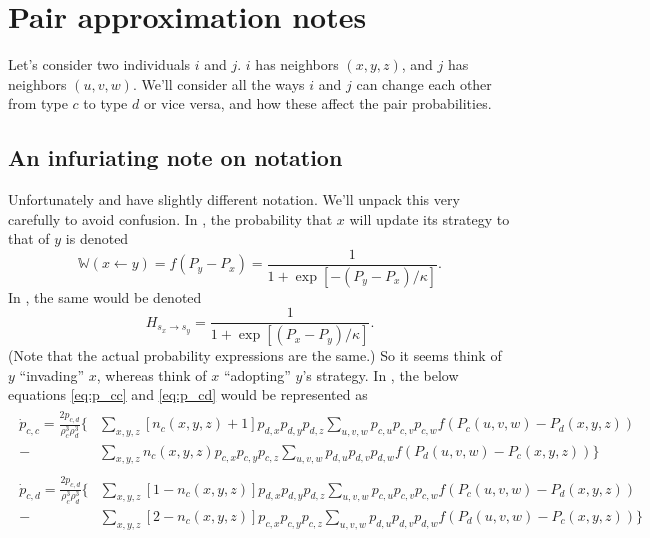 \documentclass[13pt]{amsart}
\begin{document}
\section*{Pair approximation notes}

Let's consider two individuals $i$ and $j$.
$i$ has neighbors $(x, y, z)$, and $j$ has neighbors $(u, v, w)$.
We'll consider all the ways $i$ and $j$ can change each other from type $c$ to type $d$ or vice versa, and how these affect the pair probabilities.

\subsection*{An infuriating note on notation}

Unfortunately \citet{hauert.szabo_2005} and \citet{li.etal_2019} have slightly different notation.
We'll unpack this very carefully to avoid confusion.
In \citet{hauert.szabo_2005}, the probability that $x$ will update its strategy to that of $y$ is denoted
\begin{equation}
  \mathbb{W}(x \leftarrow y) = f(P_y - P_x) = \frac{1}{1+\exp\left[ -(P_y - P_x)/\kappa \right] }.
\end{equation}
In \citet{li.etal_2019}, the same would be denoted
\begin{equation}
  H_{s_x \rightarrow s_y} = \frac{1}{1+\exp\left[ (P_x - P_y)/\kappa \right] }.
\end{equation}
(Note that the actual probability expressions are the same.)
So it seems \citet{hauert.szabo_2005} think of $y$ ``invading'' $x$, whereas \citet{li.etal_2019} think of $x$ ``adopting'' $y$'s strategy.
In \citet{hauert.szabo_2005}, the below equations \ref{eq:p_cc} and \ref{eq:p_cd} would be represented as
\begin{align}
    \begin{split}
        \label{eq:p_cc_hauert}
        \dot{p}_{c,c} =
        \frac{2p_{c,d}}{\rho_c^3 \rho_d^3} \bigg\{ & \sum_{x,y,z} \left[n_c (x,y,z) + 1 \right] p_{d,x} p_{d,y} p_{d,z}
        \sum_{u,v,w} p_{c,u} p_{c,v} p_{c,w} f(P_c(u, v, w) - P_d(x, y, z)) \\
            - & \sum_{x,y,z} n_c(x,y,z) p_{c,x} p_{c,y} p_{c,z}
        \sum_{u,v,w} p_{d,u} p_{d,v} p_{d,w} f(P_d(u, v, w) - P_c(x, y, z)) \bigg\}
    \end{split}
    \\
    \begin{split}
        \label{eq:p_cd_hauert}
        \dot{p}_{c,d}  =
        \frac{2p_{c,d}}{\rho_c^3 \rho_d^3} \bigg\{ & \sum_{x,y,z} \left[1 - n_c (x,y,z)\right] p_{d,x} p_{d,y} p_{d,z}
        \sum_{u,v,w} p_{c,u} p_{c,v} p_{c,w} f(P_c(u, v, w) - P_d(x, y, z)) \\
            - & \sum_{x,y,z} \left[ 2 - n_c(x,y,z) \right] p_{c,x} p_{c,y} p_{c,z}
        \sum_{u,v,w} p_{d,u} p_{d,v} p_{d,w} f(P_d(u, v, w) - P_c(x, y, z)) \bigg\}
    \end{split}
\end{align}
\end{document}
